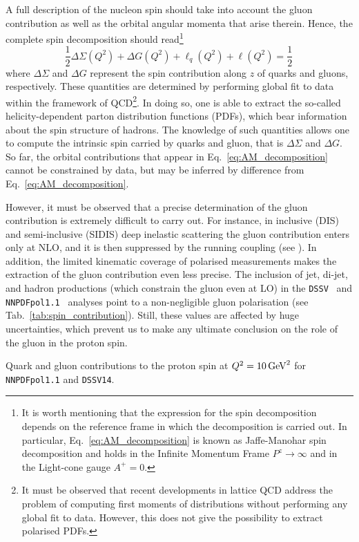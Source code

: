 A full description of the nucleon spin should take into account the gluon contribution as well as the orbital angular momenta that arise therein. Hence, the complete spin decomposition should read\footnote{\footnotesize It is worth mentioning that the expression for the spin decomposition depends on the reference frame in which the decomposition is carried out. In particular, Eq.~\eqref{eq:AM_decomposition} is known as Jaffe-Manohar spin decomposition and holds in the Infinite Momentum Frame $P^z \rightarrow \infty$ and in the Light-cone gauge $A^+=0$.}
%
\begin{equation}
  \frac{1}{2} \Delta \Sigma(Q^2) + \Delta G(Q^2) + \ell_{q}(Q^2) + \ell(Q^2) = \frac{1}{2} \,
  \label{eq:AM_decomposition}
\end{equation}
%
where $\Delta \Sigma$ and $\Delta G$ represent the spin contribution along $z$ of quarks and gluons, respectively. These quantities are determined by performing global fit to data within the framework of QCD\footnote{\footnotesize It must be observed that recent developments in lattice QCD address the problem of computing first moments of distributions without performing any global fit to data. However, this does not give the possibility to extract polarised PDFs.}. In doing so, one is able to extract the so-called helicity-dependent parton distribution functions (PDFs), which bear information about the spin structure of hadrons. The knowledge of such quantities allows one to compute the intrinsic spin carried by quarks and gluon, that is $\Delta \Sigma$ and $\Delta G$. So far, the orbital contributions that appear in Eq.~\eqref{eq:AM_decomposition} cannot be constrained by data, but may be inferred by difference from Eq.~\eqref{eq:AM_decomposition}.%

However, it must be observed that a precise determination of the gluon contribution is extremely difficult to carry out. For instance, in inclusive (DIS) and semi-inclusive (SIDIS) deep inelastic scattering the gluon contribution enters only at NLO, and it is then suppressed by the running coupling (see ). In addition, the limited kinematic coverage of polarised measurements makes the extraction of the gluon contribution even less precise. The inclusion of jet, di-jet, and hadron productions (which constrain the gluon even at LO) in the \texttt{DSSV}~\cite{DeFlorian:2019xxt} and \texttt{NNPDFpol1.1}~\cite{Nocera:2014gqa} analyses point to a non-negligible gluon polarisation (see Tab.~\ref{tab:spin_contribution}). Still, these values are affected by huge uncertainties, which prevent us to make any ultimate conclusion on the role of the gluon in the proton spin.
\begin{table}[t]
  \centering 
  \small
  
  \caption{
    \small
    Quark and gluon contributions to the proton spin at $Q^2 = 10 \, \textrm{GeV}^2$ for \texttt{NNPDFpol1.1} and \texttt{DSSV14}.
  \label{tab:spin_contribution}}
\end{table}

